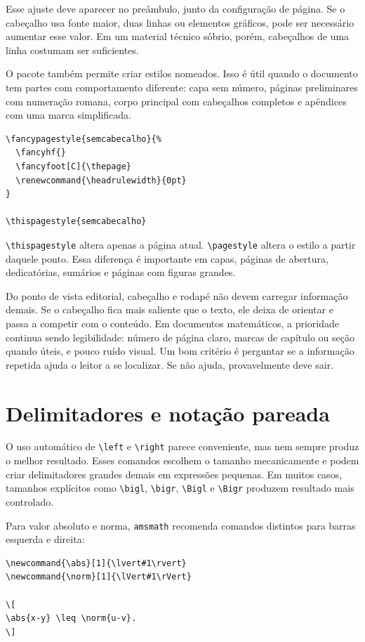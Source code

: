 Esse ajuste deve aparecer no preâmbulo, junto da configuração de página. Se o cabeçalho usa fonte maior, duas linhas ou elementos gráficos, pode ser necessário aumentar esse valor. Em um material técnico sóbrio, porém, cabeçalhos de uma linha costumam ser suficientes.

O pacote também permite criar estilos nomeados. Isso é útil quando o documento tem partes com comportamento diferente: capa sem número, páginas preliminares com numeração romana, corpo principal com cabeçalhos completos e apêndices com uma marca simplificada.

\begin{lstlisting}[language={[latex]TeX}, caption={Estilo de página nomeado}]
\fancypagestyle{semcabecalho}{%
  \fancyhf{}
  \fancyfoot[C]{\thepage}
  \renewcommand{\headrulewidth}{0pt}
}

\thispagestyle{semcabecalho}
\end{lstlisting}

\verb|\thispagestyle| altera apenas a página atual. \verb|\pagestyle| altera o estilo a partir daquele ponto. Essa diferença é importante em capas, páginas de abertura, dedicatórias, sumários e páginas com figuras grandes.

Do ponto de vista editorial, cabeçalho e rodapé não devem carregar informação demais. Se o cabeçalho fica mais saliente que o texto, ele deixa de orientar e passa a competir com o conteúdo. Em documentos matemáticos, a prioridade continua sendo legibilidade: número de página claro, marcas de capítulo ou seção quando úteis, e pouco ruído visual. Um bom critério é perguntar se a informação repetida ajuda o leitor a se localizar. Se não ajuda, provavelmente deve sair.

\section{Delimitadores e notação pareada}

O uso automático de \verb|\left| e \verb|\right| parece conveniente, mas nem sempre produz o melhor resultado. Esses comandos escolhem o tamanho mecanicamente e podem criar delimitadores grandes demais em expressões pequenas. Em muitos casos, tamanhos explícitos como \verb|\bigl|, \verb|\bigr|, \verb|\Bigl| e \verb|\Bigr| produzem resultado mais controlado.

Para valor absoluto e norma, \texttt{amsmath} recomenda comandos distintos para barras esquerda e direita:

\begin{lstlisting}[language={[latex]TeX}, caption={Delimitadores com amsmath}]
\newcommand{\abs}[1]{\lvert#1\rvert}
\newcommand{\norm}[1]{\lVert#1\rVert}

\[
\abs{x-y} \leq \norm{u-v}.
\]
\end{lstlisting}

